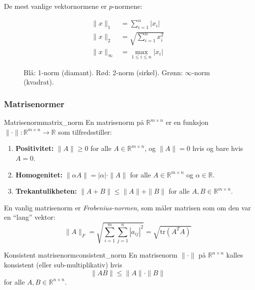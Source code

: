 De mest vanlige vektornormene er $p$-normene:

\begin{align*}
	\|x\|_1      & = \sum_{i=1}^n |x_i| \tag{taxicab}                 \\
	\|x\|_2      & = \sqrt{\sum_{i=1}^n x_i^2} \tag{euklidisk}           \\
	\|x\|_\infty & = \max_{1 \leq i \leq n} |x_i| \tag{maksnorm}
\end{align*}


\begin{figure}[h]
	\centering
	
	\caption{Blå: 1-norm (diamant). Rød: 2-norm (sirkel). Grønn: $\infty$-norm (kvadrat).}
	\label{fig:vector_norms}
\end{figure}

\subsubsection{Matrisenormer}

\begin{definition}{Matrisenorm}{matrix_norm}
	En matrisenorm på $\mathbb{R}^{m \times n}$ er en funksjon $\|\cdot\| : \mathbb{R}^{m \times n} \to \mathbb{R}$ som tilfredsstiller:
	\begin{enumerate}
		\item \textbf{Positivitet:} $\|A\| \geq 0$ for alle $A \in \mathbb{R}^{m \times n}$, og $\|A\| = 0$ hvis og bare hvis $A = 0$.
		\item \textbf{Homogenitet:}
		$\|\alpha A\| = |\alpha| \cdot \|A\|$ for alle $A \in \mathbb{R}^{m \times n}$ og $\alpha \in \mathbb{R}$.
		\item \textbf{Trekantulikheten:}
		$\|A + B\| \leq \|A\| + \|B\|$ for alle $A,B \in \mathbb{R}^{m \times n}$.
	\end{enumerate}
\end{definition}

En vanlig matrisenorm er \emph{Frobenius-normen}, som måler matrisen som om den var en \enquote{lang} vektor:
\[
	\|A\|_F = \sqrt{\sum_{i=1}^m \sum_{j=1}^n |a_{ij}|^2} = \sqrt{\text{tr}(A^T A)}
\]

\begin{definition}{Konsistent matrisenorm}{consistent_norm}
	En matrisenorm $\|\cdot\|$ på $\mathbb{R}^{n \times n}$ kalles konsistent (eller sub-multiplikativ) hvis
	\[
		\|AB\| \leq \|A\| \cdot \|B\|
	\]
	for alle $A, B \in \mathbb{R}^{n \times n}$.
\end{definition}

